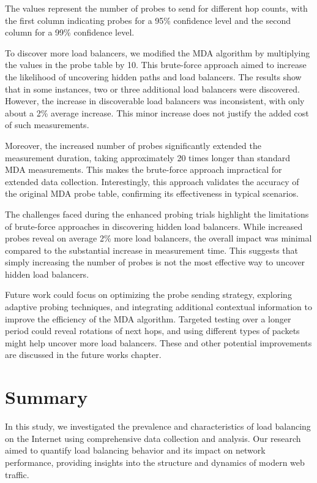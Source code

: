 \documentclass[12pt]{cwru_thesis}
\begin{document}
The values represent the number of probes to send for different hop counts, with the first column indicating probes for a 95\% confidence level and the second column for a 99\% confidence level.

To discover more load balancers, we modified the MDA algorithm by multiplying the values in the probe table by 10. This brute-force approach aimed to increase the likelihood of uncovering hidden paths and load balancers. The results show that in some instances, two or three additional load balancers were discovered. However, the increase in discoverable load balancers was inconsistent, with only about a 2\% average increase. This minor increase does not justify the added cost of such measurements.

Moreover, the increased number of probes significantly extended the measurement duration, taking approximately 20 times longer than standard MDA measurements. This makes the brute-force approach impractical for extended data collection. Interestingly, this approach validates the accuracy of the original MDA probe table, confirming its effectiveness in typical scenarios.

The challenges faced during the enhanced probing trials highlight the limitations of brute-force approaches in discovering hidden load balancers. While increased probes reveal on average 2\% more load balancers, the overall impact was minimal compared to the substantial increase in measurement time. This suggests that simply increasing the number of probes is not the most effective way to uncover hidden load balancers.

Future work could focus on optimizing the probe sending strategy, exploring adaptive probing techniques, and integrating additional contextual information to improve the efficiency of the MDA algorithm. Targeted testing over a longer period could reveal rotations of next hops, and using different types of packets might help uncover more load balancers. These and other potential improvements are discussed in the future works chapter.



\chapter{Summary}
In this study, we investigated the prevalence and characteristics of load balancing on the Internet using comprehensive data collection and analysis. Our research aimed to quantify load balancing behavior and its impact on network performance, providing insights into the structure and dynamics of modern web traffic.
\end{document}
